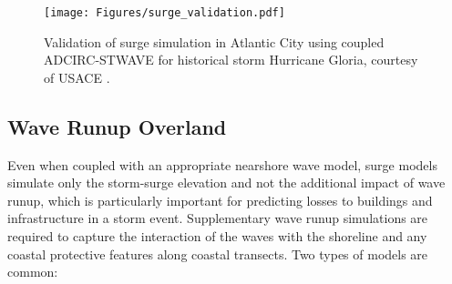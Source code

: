 \begin{figure}[htb]
    \centering
    \texttt{[image: Figures/surge\_validation.pdf]}
    \caption{Validation of surge simulation in Atlantic City using coupled ADCIRC-STWAVE for historical storm Hurricane Gloria, courtesy of USACE \citep{nadal-caraballo2015north}.}
    \label{fig:surge_validation}
\end{figure}

\subsection{Wave Runup Overland}

Even when coupled with an appropriate nearshore wave model, surge models simulate only the storm-surge elevation and not the additional impact of wave runup, which is particularly important for predicting losses to buildings and infrastructure in a storm event. Supplementary wave runup simulations are required to capture the interaction of the waves with the shoreline and any coastal protective features along coastal transects. Two types of models are common:

